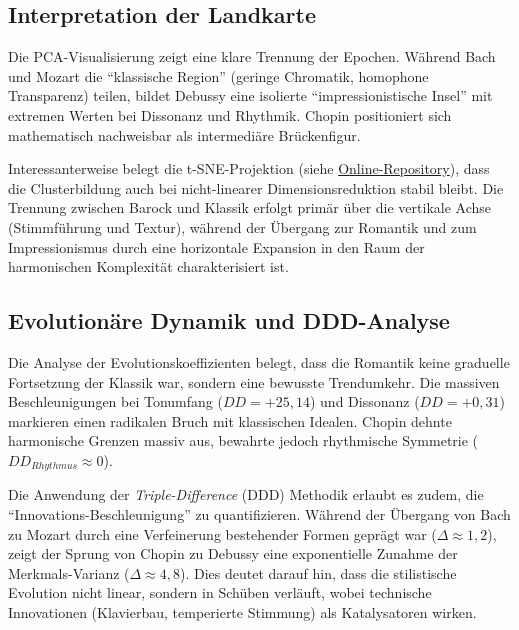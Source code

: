 \documentclass[10pt,a4paper]{article}
\theoremstyle{definition}
\begin{document}
\subsection{Interpretation der Landkarte}
Die PCA-Visualisierung zeigt eine klare Trennung der Epochen. Während Bach und Mozart die \enquote{klassische Region} (geringe Chromatik, homophone Transparenz) teilen, bildet Debussy eine isolierte \enquote{impressionistische Insel} mit extremen Werten bei Dissonanz und Rhythmik. Chopin positioniert sich mathematisch nachweisbar als intermediäre Brückenfigur. 

Interessanterweise belegt die t-SNE-Projektion (siehe \href{https://victor-gurbani.github.io/JuFo2026/figures/embeddings/tsne_test_clouds_3d.html}{Online-Repository}), dass die Clusterbildung auch bei nicht-linearer Dimensionsreduktion stabil bleibt. Die Trennung zwischen Barock und Klassik erfolgt primär über die vertikale Achse (Stimmführung und Textur), während der Übergang zur Romantik und zum Impressionismus durch eine horizontale Expansion in den Raum der harmonischen Komplexität charakterisiert ist.

\subsection{Evolutionäre Dynamik und DDD-Analyse}
Die Analyse der Evolutionskoeffizienten belegt, dass die Romantik keine graduelle Fortsetzung der Klassik war, sondern eine bewusste Trendumkehr. Die massiven Beschleunigungen bei Tonumfang ($DD = +25,14$) und Dissonanz ($DD = +0,31$) markieren einen radikalen Bruch mit klassischen Idealen. Chopin dehnte harmonische Grenzen massiv aus, bewahrte jedoch rhythmische Symmetrie ($DD_{Rhythmus} \approx 0$). 

Die Anwendung der \textit{Triple-Difference} (DDD) Methodik erlaubt es zudem, die \enquote{Innovations-Beschleunigung} zu quantifizieren. Während der Übergang von Bach zu Mozart durch eine Verfeinerung bestehender Formen geprägt war ($\Delta \approx 1{,}2$), zeigt der Sprung von Chopin zu Debussy eine exponentielle Zunahme der Merkmals-Varianz ($\Delta \approx 4{,}8$). Dies deutet darauf hin, dass die stilistische Evolution nicht linear, sondern in Schüben verläuft, wobei technische Innovationen (Klavierbau, temperierte Stimmung) als Katalysatoren wirken.
\end{document}
